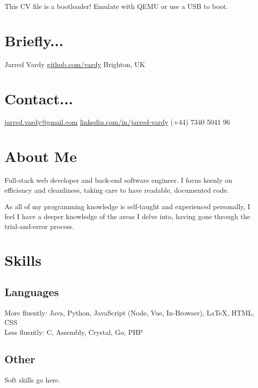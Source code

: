 \documentclass[]{jvcv}
\begin{document}
       {This CV file is a bootloader! Emulate with QEMU or use a USB to boot.}


%
\begin{aside}
	\section{Briefly...}\vspace{0.1cm}
	Jarred Vardy
	\hyperref[https://github.com/vardy/]{github.com/vardy}
	Brighton, UK
	\section{Contact...}\vspace{0.1cm}
	\hyperref[mailto:jarred.vardy@gmail.com]{jarred.vardy@gmail.com}
	\hyperref[https://linkedin.com/in/jarred-vardy]{linkedin.com/in/jarred-vardy}
	(+44) 7340 5041 96
\end{aside}

%
\section{About Me}
Full-stack web developer and back-end software engineer.
I focus keenly on efficiency and cleanliness, taking care to have readable, documented code.

As all of my programming knowledge is self-taught and experienced personally, I feel I have a
deeper knowledge of the areas I delve into, having gone through the trial-and-error process.

%
\vspace{0.5cm}
\section{Skills}
\subsection{Languages}
More fluently: Java, Python, JavaScript (Node, Vue, In-Browser), LaTeX, HTML, CSS\\
Less fluently: C, Assembly, Crystal, Go, PHP

\vspace{0.1cm}
\subsection{Other}
Soft skills go here.
\end{document}

